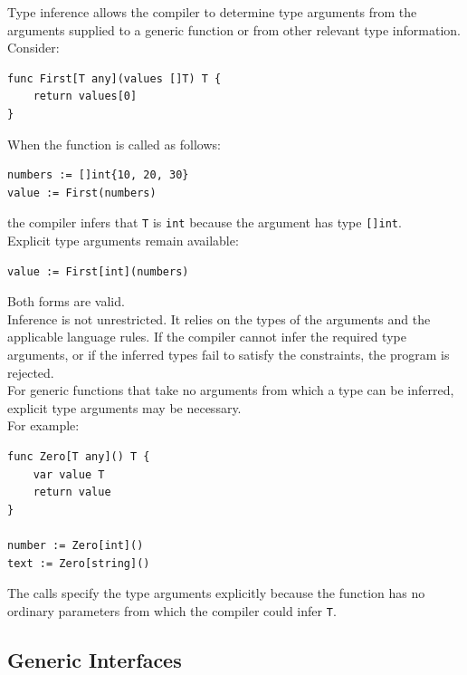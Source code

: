 Type inference allows the compiler to determine type arguments from the arguments supplied to a generic function or from other relevant type information.\\

Consider:

\begin{lstlisting}
func First[T any](values []T) T {
    return values[0]
}
\end{lstlisting}

When the function is called as follows:

\begin{lstlisting}
numbers := []int{10, 20, 30}
value := First(numbers)
\end{lstlisting}

the compiler infers that \texttt{T} is \texttt{int} because the argument has type \texttt{[]int}.\\

Explicit type arguments remain available:

\begin{lstlisting}
value := First[int](numbers)
\end{lstlisting}

Both forms are valid.\\

Inference is not unrestricted. It relies on the types of the arguments and the applicable language rules. If the compiler cannot infer the required type arguments, or if the inferred types fail to satisfy the constraints, the program is rejected.\\

For generic functions that take no arguments from which a type can be inferred, explicit type arguments may be necessary.\\

For example:

\begin{lstlisting}
func Zero[T any]() T {
    var value T
    return value
}

number := Zero[int]()
text := Zero[string]()
\end{lstlisting}

The calls specify the type arguments explicitly because the function has no ordinary parameters from which the compiler could infer \texttt{T}.

\subsection{Generic Interfaces}

